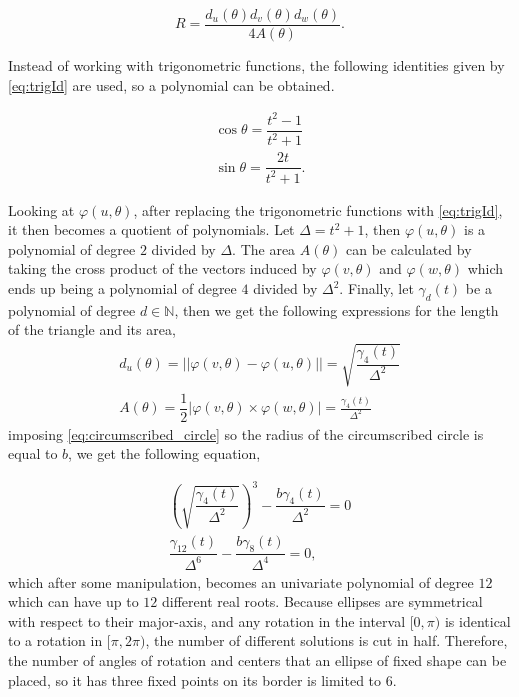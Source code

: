 \begin{equation}\label{eq:circumscribed_circle}
R = \dfrac{d_u(\theta)d_v(\theta)d_w(\theta)}{4A(\theta)}.
\end{equation}

Instead of working with trigonometric functions, the following identities given by \autoref{eq:trigId} are used, so a polynomial can be obtained.

\begin{equation}\label{eq:trigId}
\begin{array}{c}
\cos{\theta} = \dfrac{t^2-1}{t^2+1}\\
\sin{\theta} = \dfrac{2t}{t^2+1}.
\end{array}
\end{equation}

Looking at $\varphi(u, \theta)$, after replacing the trigonometric functions with \autoref{eq:trigId}, it then becomes a quotient of polynomials. Let $\Delta=t^2+1$, then $\varphi(u, \theta)$ is a polynomial of degree $2$ divided by $\Delta$. The area $A(\theta)$ can be calculated by taking the cross product of the vectors induced by $\varphi(v, \theta)$ and $\varphi(w, \theta)$ which ends up being a polynomial of degree $4$ divided by $\Delta^2$. Finally, let $\gamma_d(t)$ be a polynomial of degree $d\in\mathbb{N}$, then we get the following expressions for the length of the triangle and its area,
\begin{align*}
d_u(\theta)=||\varphi(v, \theta)-\varphi(u, \theta)|| = \sqrt{\dfrac{\gamma_4(t)}{\Delta^2}}\\
A(\theta)=\dfrac{1}{2}|\varphi(v, \theta) \times \varphi(w, \theta)|=\frac{\gamma_4(t)}{\Delta^2}
\end{align*}
imposing \autoref{eq:circumscribed_circle} so the radius of the circumscribed circle is equal to $b$, we get the following equation,

\begin{align*}
\left(\sqrt{\dfrac{\gamma_4(t)}{\Delta^2}}\right)^3 - \dfrac{b\gamma_4(t)}{\Delta^2} = 0\\
\dfrac{\gamma_{12}(t)}{\Delta^6} - \dfrac{b\gamma_8(t)}{\Delta^4} = 0,
\end{align*}
which after some manipulation, becomes an univariate polynomial of degree $12$ which can have up to $12$ different real roots. Because ellipses are symmetrical with respect to their major-axis, and any rotation in the interval $[0, \pi)$ is identical to a rotation in $[\pi, 2\pi)$, the number of different solutions is cut in half.
Therefore, the number of angles of rotation and centers that an ellipse of fixed shape can be placed, so it has three fixed points on its border is limited to $6$.

